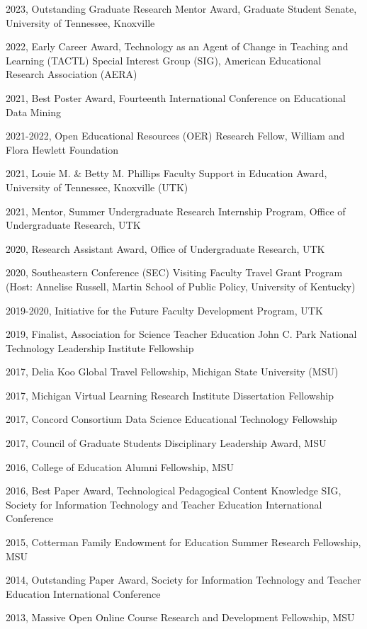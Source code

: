 \documentclass[
  14,
]{article}
\begin{document}
2023, Outstanding Graduate Research Mentor Award, Graduate Student
Senate, University of Tennessee, Knoxville

2022, Early Career Award, Technology as an Agent of Change in Teaching
and Learning (TACTL) Special Interest Group (SIG), American Educational
Research Association (AERA)

2021, Best Poster Award, Fourteenth International Conference on
Educational Data Mining

2021-2022, Open Educational Resources (OER) Research Fellow, William and
Flora Hewlett Foundation

2021, Louie M. \& Betty M. Phillips Faculty Support in Education Award,
University of Tennessee, Knoxville (UTK)

2021, Mentor, Summer Undergraduate Research Internship Program, Office
of Undergraduate Research, UTK

2020, Research Assistant Award, Office of Undergraduate Research, UTK

2020, Southeastern Conference (SEC) Visiting Faculty Travel Grant
Program (Host: Annelise Russell, Martin School of Public Policy,
University of Kentucky)

2019-2020, Initiative for the Future Faculty Development Program, UTK

2019, Finalist, Association for Science Teacher Education John C. Park
National Technology Leadership Institute Fellowship

2017, Delia Koo Global Travel Fellowship, Michigan State University
(MSU)

2017, Michigan Virtual Learning Research Institute Dissertation
Fellowship

2017, Concord Consortium Data Science Educational Technology Fellowship

2017, Council of Graduate Students Disciplinary Leadership Award, MSU

2016, College of Education Alumni Fellowship, MSU

2016, Best Paper Award, Technological Pedagogical Content Knowledge SIG,
Society for Information Technology and Teacher Education International
Conference

2015, Cotterman Family Endowment for Education Summer Research
Fellowship, MSU

2014, Outstanding Paper Award, Society for Information Technology and
Teacher Education International Conference

2013, Massive Open Online Course Research and Development Fellowship,
MSU
\end{document}
